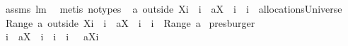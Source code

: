 \begin{isabellebody}
\isamarkupfalse%
\ assms\ lm{}{}\ \isamarkupfalse%
\ {\isacharparenleft}metis\ {\isacharparenleft}no{\isacharunderscore}types{\isacharparenright}{\isacharparenright}\isanewline
{}\isamarkupfalse%
\ \isamarkupfalse%
\isanewline
{\isachardoublequoteopen}{\isacharparenleft}a\ outside\ {\isacharparenleft}X{\isasymunion}{\isacharbraceleft}i{\isacharbraceright}{\isacharparenright}{\isacharparenright}\ {\isasymunion}\ {\isacharparenleft}{\isacharbraceleft}{\isacharparenleft}i{\isacharcomma}\ {\isasymUnion}\ {\isacharparenleft}a{\isacharbackquote}{\isacharbackquote}{\isacharparenleft}X\ {\isasymunion}\ {\isacharbraceleft}i{\isacharbraceright}{\isacharparenright}{\isacharparenright}{\isacharparenright}{\isacharbraceright}\ {\isacharminus}\ {\isacharbraceleft}{\isacharparenleft}i{\isacharcomma}{\isacharbraceleft}{\isacharbraceright}{\isacharparenright}{\isacharbraceright}{\isacharparenright}\ {\isasymin}\ allocationsUniverse\ {\isacharampersand}\ \isanewline
{\isasymUnion}\ {\isacharparenleft}Range\ {\isacharparenleft}{\isacharparenleft}a\ outside\ {\isacharparenleft}X{\isasymunion}{\isacharbraceleft}i{\isacharbraceright}{\isacharparenright}{\isacharparenright}\ {\isasymunion}\ {\isacharparenleft}{\isacharbraceleft}{\isacharparenleft}i{\isacharcomma}\ {\isasymUnion}\ {\isacharparenleft}a{\isacharbackquote}{\isacharbackquote}{\isacharparenleft}X\ {\isasymunion}\ {\isacharbraceleft}i{\isacharbraceright}{\isacharparenright}{\isacharparenright}{\isacharparenright}{\isacharbraceright}\ {\isacharminus}\ {\isacharbraceleft}{\isacharparenleft}i{\isacharcomma}{\isacharbraceleft}{\isacharbraceright}{\isacharparenright}{\isacharbraceright}{\isacharparenright}{\isacharparenright}{\isacharparenright}\ {\isacharequal}\ {\isasymUnion}{\isacharparenleft}Range\ a{\isacharparenright}{\isachardoublequoteclose}\ \isamarkupfalse%
\isanewline
presburger\isanewline
{}\isamarkupfalse%
\ \isamarkupfalse%
\ {\isachardoublequoteopen}{\isacharbraceleft}{\isacharparenleft}i{\isacharcomma}\ {\isasymUnion}\ {\isacharparenleft}a{\isacharbackquote}{\isacharbackquote}{\isacharparenleft}X\ {\isasymunion}\ {\isacharbraceleft}i{\isacharbraceright}{\isacharparenright}{\isacharparenright}{\isacharparenright}{\isacharbraceright}\ {\isacharminus}\ {\isacharbraceleft}{\isacharparenleft}i{\isacharcomma}{\isacharbraceleft}{\isacharbraceright}{\isacharparenright}{\isacharbraceright}\ {\isacharequal}\ {\isacharbraceleft}i{\isacharbraceright}\ {\isasymtimes}\ {\isacharparenleft}{\isacharbraceleft}{\isasymUnion}\ {\isacharparenleft}a{\isacharbackquote}{\isacharbackquote}{\isacharparenleft}X{\isasymunion}{\isacharbraceleft}i{\isacharbraceright}{\isacharparenright}{\isacharparenright}{\isacharbraceright}\ {\isacharminus}\ {\isacharbraceleft}{\isacharbraceleft}{\isacharbraceright}{\isacharbraceright}{\isacharparenright}{\isachardoublequoteclose}\ \isanewline

\end{isabellebody}
